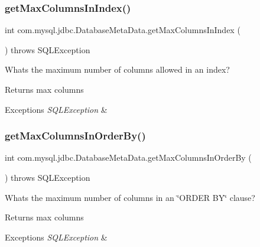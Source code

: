 \subsubsection{\texorpdfstring{get\+Max\+Columns\+In\+Index()}{getMaxColumnsInIndex()}}
{\footnotesize\ttfamily int com.\+mysql.\+jdbc.\+Database\+Meta\+Data.\+get\+Max\+Columns\+In\+Index (\begin{DoxyParamCaption}{ }\end{DoxyParamCaption}) throws S\+Q\+L\+Exception}

What\textquotesingle{}s the maximum number of columns allowed in an index?

\begin{DoxyReturn}{Returns}
max columns 
\end{DoxyReturn}

\begin{DoxyExceptions}{Exceptions}
{\em S\+Q\+L\+Exception} & \\
\hline
\end{DoxyExceptions}
\mbox{\label{classcom_1_1mysql_1_1jdbc_1_1_database_meta_data_a1ee89c339f98c6c6e8c4ddcfe77b21f4}} 
\subsubsection{\texorpdfstring{get\+Max\+Columns\+In\+Order\+By()}{getMaxColumnsInOrderBy()}}
{\footnotesize\ttfamily int com.\+mysql.\+jdbc.\+Database\+Meta\+Data.\+get\+Max\+Columns\+In\+Order\+By (\begin{DoxyParamCaption}{ }\end{DoxyParamCaption}) throws S\+Q\+L\+Exception}

What\textquotesingle{}s the maximum number of columns in an \char`\"{}\+O\+R\+D\+E\+R B\+Y\char`\"{} clause?

\begin{DoxyReturn}{Returns}
max columns 
\end{DoxyReturn}

\begin{DoxyExceptions}{Exceptions}
{\em S\+Q\+L\+Exception} & \\
\hline
\end{DoxyExceptions}
\mbox{\label{classcom_1_1mysql_1_1jdbc_1_1_database_meta_data_a9b7ced028d89b5e05660f76eaef80c4a}} 
